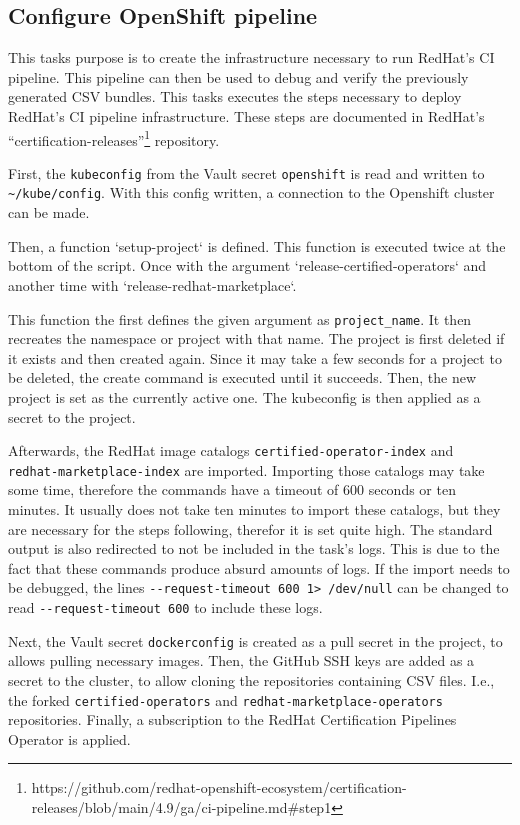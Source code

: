 \subsection{Configure OpenShift pipeline}\label{subsec:configure-openshift-pipeline}

This tasks purpose is to create the infrastructure necessary to run RedHat's CI pipeline.
This pipeline can then be used to debug and verify the previously generated CSV bundles.
This tasks executes the steps necessary to deploy RedHat's CI pipeline infrastructure.
These steps are documented in RedHat's ``certification-releases''\footnote{https://github.com/redhat-openshift-ecosystem/certification-releases/blob/main/4.9/ga/ci-pipeline.md\#step1} repository.

First, the \verb|kubeconfig| from the Vault secret \verb|openshift| is read and written to \verb|~/kube/config|.
With this config written, a connection to the Openshift cluster can be made.

Then, a function `setup-project` is defined.
This function is executed twice at the bottom of the script.
Once with the argument `release-certified-operators` and another time with `release-redhat-marketplace`.

This function the first defines the given argument as \verb|project_name|.
It then recreates the namespace or project with that name.
The project is first deleted if it exists and then created again.
Since it may take a few seconds for a project to be deleted, the create command is executed until it succeeds.
Then, the new project is set as the currently active one.
The kubeconfig is then applied as a secret to the project.

Afterwards, the RedHat image catalogs \verb|certified-operator-index| and \\ \verb|redhat-marketplace-index| are imported.
Importing those catalogs may take some time, therefore the commands have a timeout of 600 seconds or ten minutes.
It usually does not take ten minutes to import these catalogs, but they are necessary for the steps following, therefor it is set quite high.
The standard output is also redirected to not be included in the task's logs.
This is due to the fact that these commands produce absurd amounts of logs.
If the import needs to be debugged, the lines \verb|--request-timeout 600 1> /dev/null| can be changed to read \verb|--request-timeout 600| to include these logs.

Next, the Vault secret \verb|dockerconfig| is created as a pull secret in the project, to allows pulling necessary images.
Then, the GitHub SSH keys are added as a secret to the cluster, to allow cloning the repositories containing CSV files.
I.e., the forked \verb|certified-operators| and \verb|redhat-marketplace-operators| repositories.
Finally, a subscription to the RedHat Certification Pipelines Operator is applied.
